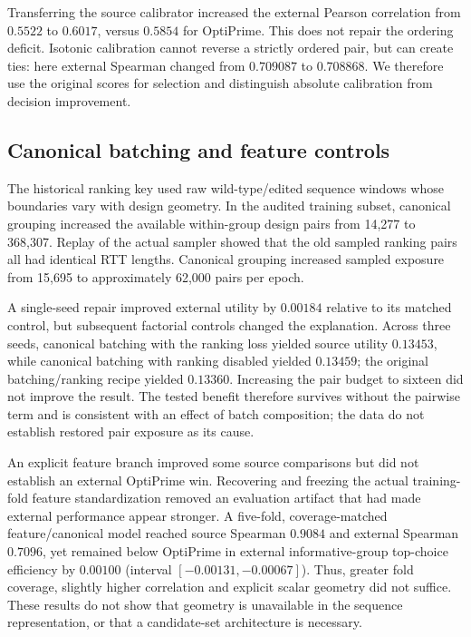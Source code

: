 Transferring the source calibrator increased the external Pearson correlation from $0.5522$ to $0.6017$, versus $0.5854$ for OptiPrime. This does not repair the ordering deficit. Isotonic calibration cannot reverse a strictly ordered pair, but can create ties: here external Spearman changed from $0.709087$ to $0.708868$. We therefore use the original scores for selection and distinguish absolute calibration from decision improvement.

\subsection{Canonical batching and feature controls}
\label{sec:supgroupcontrols}
The historical ranking key used raw wild-type/edited sequence windows whose boundaries vary with design geometry. In the audited training subset, canonical grouping increased the available within-group design pairs from 14,277 to 368,307. Replay of the actual sampler showed that the old sampled ranking pairs all had identical RTT lengths. Canonical grouping increased sampled exposure from 15,695 to approximately 62,000 pairs per epoch.

A single-seed repair improved external utility by $0.00184$ relative to its matched control, but subsequent factorial controls changed the explanation. Across three seeds, canonical batching with the ranking loss yielded source utility $0.13453$, while canonical batching with ranking disabled yielded $0.13459$; the original batching/ranking recipe yielded $0.13360$. Increasing the pair budget to sixteen did not improve the result. The tested benefit therefore survives without the pairwise term and is consistent with an effect of batch composition; the data do not establish restored pair exposure as its cause.

An explicit feature branch improved some source comparisons but did not establish an external OptiPrime win. Recovering and freezing the actual training-fold feature standardization removed an evaluation artifact that had made external performance appear stronger. A five-fold, coverage-matched feature/canonical model reached source Spearman $0.9084$ and external Spearman $0.7096$, yet remained below OptiPrime in external informative-group top-choice efficiency by $0.00100$ (interval $[-0.00131,-0.00067]$). Thus, greater fold coverage, slightly higher correlation and explicit scalar geometry did not suffice. These results do not show that geometry is unavailable in the sequence representation, or that a candidate-set architecture is necessary.

